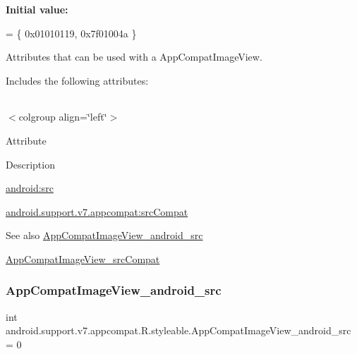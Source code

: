 {\bfseries Initial value\+:}
\begin{DoxyCode}
= \{
            0x01010119, 0x7f01004a
        \}
\end{DoxyCode}
Attributes that can be used with a App\+Compat\+Image\+View. 

Includes the following attributes\+:

\tabulinesep=1mm
\begin{longtabu} spread 0pt [c]{*{0}{|X[-1]}|}
\hline
\end{longtabu}
$<$colgroup align=\char`\"{}left\char`\"{}$>$ 

Attribute

Description 

{\ttfamily \hyperlink{classandroid_1_1support_1_1v7_1_1appcompat_1_1R_1_1styleable_aab0b9cf835ecfb5667add5af2b560883}{android\+:src}}

{\ttfamily \hyperlink{classandroid_1_1support_1_1v7_1_1appcompat_1_1R_1_1styleable_af3c899a6b3300b34fe73e036212d9a16}{android.\+support.\+v7.\+appcompat\+:src\+Compat}}

\begin{DoxySeeAlso}{See also}
\hyperlink{classandroid_1_1support_1_1v7_1_1appcompat_1_1R_1_1styleable_aab0b9cf835ecfb5667add5af2b560883}{App\+Compat\+Image\+View\+\_\+android\+\_\+src} 

\hyperlink{classandroid_1_1support_1_1v7_1_1appcompat_1_1R_1_1styleable_af3c899a6b3300b34fe73e036212d9a16}{App\+Compat\+Image\+View\+\_\+src\+Compat} 
\end{DoxySeeAlso}
\mbox{\label{classandroid_1_1support_1_1v7_1_1appcompat_1_1R_1_1styleable_aab0b9cf835ecfb5667add5af2b560883}} 
\subsubsection{\texorpdfstring{App\+Compat\+Image\+View\+\_\+android\+\_\+src}{AppCompatImageView\_android\_src}}
{\footnotesize\ttfamily int android.\+support.\+v7.\+appcompat.\+R.\+styleable.\+App\+Compat\+Image\+View\+\_\+android\+\_\+src = 0\hspace{0.3cm}{\ttfamily [static]}}

